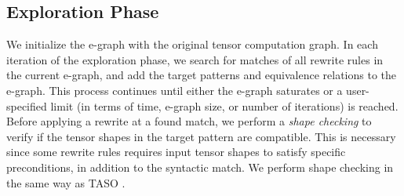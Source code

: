 \subsection{Exploration Phase}
\label{sec:saturation}

We initialize the e-graph with the original tensor computation graph.
In each iteration of the exploration phase, we search for matches of all rewrite rules in the current e-graph, and add the target patterns and equivalence relations to the e-graph.
This process continues until either the e-graph saturates or a user-specified limit (in terms of time, e-graph size, or number of iterations) is reached.
Before applying a rewrite at a found match, we perform a \textit{shape checking} to verify if the tensor shapes in the target pattern are compatible.
This is necessary since some rewrite rules requires input tensor shapes to satisfy specific preconditions, in addition to the syntactic match.
We perform shape checking in the same way as TASO \cite{taso}.





